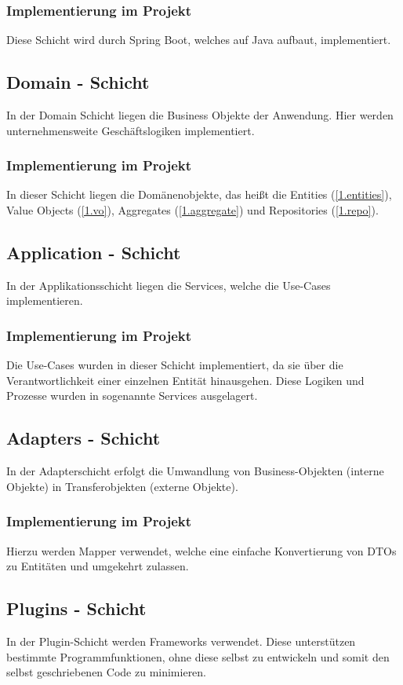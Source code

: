     		\subsubsection{Implementierung im Projekt}
    		Diese Schicht wird durch Spring Boot, welches auf Java aufbaut, implementiert. 
    	
    	\subsection{Domain - Schicht}
    	In der Domain Schicht liegen die Business Objekte der Anwendung. Hier werden unternehmensweite Geschäftslogiken implementiert.
    		\subsubsection{Implementierung im Projekt}
    		In dieser Schicht liegen die Domänenobjekte, das heißt die Entities (\cref{1.entities}), Value Objects (\cref{1.vo}), Aggregates (\cref{1.aggregate}) und Repositories (\cref{1.repo}).
    	
    	\subsection{Application - Schicht}
    	In der Applikationsschicht liegen die Services, welche die Use-Cases implementieren.
    		\subsubsection{Implementierung im Projekt}
    		Die Use-Cases wurden in dieser Schicht implementiert, da sie über die Verantwortlichkeit einer einzelnen Entität hinausgehen. Diese Logiken und Prozesse wurden in sogenannte Services ausgelagert.
    	
    	\subsection{Adapters - Schicht}
    	In der Adapterschicht erfolgt die Umwandlung von Business-Objekten (interne Objekte) in Transferobjekten (externe Objekte).
    		\subsubsection{Implementierung im Projekt}
    		Hierzu werden Mapper verwendet, welche eine einfache Konvertierung von DTOs zu Entitäten und umgekehrt zulassen.
    		
    	\subsection{Plugins - Schicht}
    	In der Plugin-Schicht werden Frameworks verwendet. Diese unterstützen bestimmte Programmfunktionen, ohne diese selbst zu entwickeln und somit den selbst geschriebenen Code zu minimieren.
